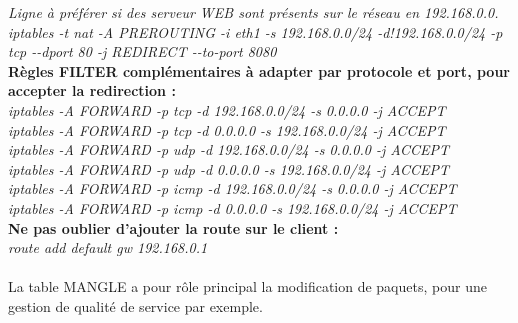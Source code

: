 \documentclass[a4paper,11pt]{article}				    %
\begin{document}
{\textit{Ligne \`a pr\'ef\'erer si des serveur WEB sont pr\'esents sur le r\'eseau en 192.168.0.0.}\\
{\sl \color{blue}iptables -t nat -A PREROUTING -i eth1 -s 192.168.0.0/24 -d!192.168.0.0/24 -p tcp {-}{-}dport 80 -j REDIRECT {-}{-}to-port 8080}\\

\textbf{R\`egles FILTER compl\'ementaires \`a adapter par protocole et port, pour accepter la redirection :}\\
{\sl \color{blue}iptables -A FORWARD -p tcp -d 192.168.0.0/24 -s 0.0.0.0 -j ACCEPT}\\
{\sl \color{blue}iptables -A FORWARD -p tcp -d 0.0.0.0 -s 192.168.0.0/24 -j ACCEPT}\\
{\sl \color{blue}iptables -A FORWARD -p udp -d 192.168.0.0/24 -s 0.0.0.0 -j ACCEPT}\\
{\sl \color{blue}iptables -A FORWARD -p udp -d 0.0.0.0 -s 192.168.0.0/24 -j ACCEPT}\\
{\sl \color{blue}iptables -A FORWARD -p icmp -d 192.168.0.0/24 -s 0.0.0.0 -j ACCEPT}\\
{\sl \color{blue}iptables -A FORWARD -p icmp -d 0.0.0.0 -s 192.168.0.0/24 -j ACCEPT}\\

\textbf{Ne pas oublier d'ajouter la route sur le client :}\\
{\sl \color{blue}route add default gw 192.168.0.1}\\

}
{
\\La table MANGLE a pour r\^ole principal la modification de paquets, pour une gestion de qualit\'e de service par exemple.
}
\end{document}
